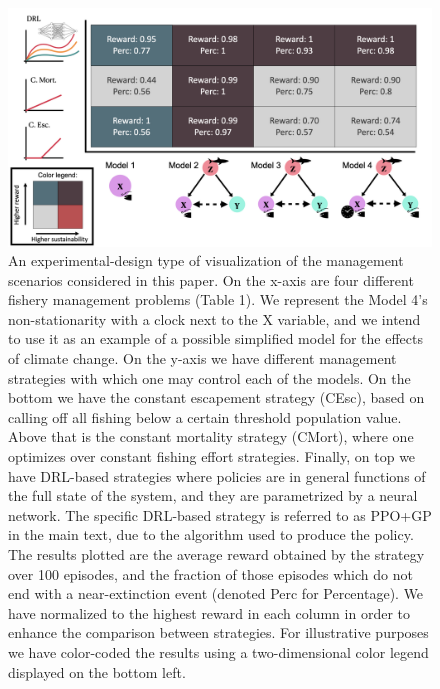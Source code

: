 \documentclass{article}
\begin{document}
\begin{figure}[H]

{\centering \includegraphics[width=6.5in]{figures/conceptual-v3} 

}

\caption{An experimental-design type of visualization of the management scenarios considered in this paper. On the x-axis are four different fishery management problems (Table 1). We represent the Model 4’s non-stationarity with a clock next to the X variable, and we intend to use it as an example of a possible simplified model for the effects of climate change. On the y-axis we have different management strategies with which one may control each of the models. On the bottom we have the constant escapement strategy (CEsc), based on calling off all fishing below a certain threshold population value. Above that is the constant mortality strategy (CMort), where one optimizes over constant fishing effort strategies. Finally, on top we have DRL-based strategies where policies are in general functions of the full state of the system, and they are parametrized by a neural network. The specific DRL-based strategy is referred to as PPO+GP in the main text, due to the algorithm used to produce the policy. The results plotted are the average reward obtained by the strategy over 100 episodes, and the fraction of those episodes which do not end with a near-extinction event (denoted Perc for Percentage). We have normalized to the highest reward in each column in order to enhance the comparison between strategies. For illustrative purposes we have color-coded the results using a two-dimensional color legend displayed on the bottom left.}\label{fig:conceptual-v2}
\end{figure}
\end{document}
